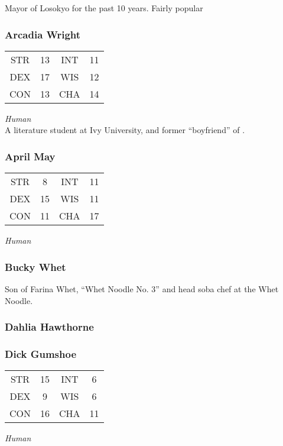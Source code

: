 Mayor of Losokyo for the past 10 years. Fairly popular


\subsubsection{Arcadia Wright}
\label{people:phoenix}
\begin{center}
\begin{tabular}{c c|c c}
STR & 13 & INT & 11\\
DEX & 17 & WIS & 12 \\
CON & 13 & CHA & 14 \end{tabular}\end{center}
\textit{Human}\\
A literature student at Ivy University, and former ``boyfriend'' of . 



\subsubsection{April May}
\label{people:aprilmay}
\begin{center}
\begin{tabular}{c c|c c}
STR & 8 & INT & 11\\
DEX & 15 & WIS & 11 \\
CON & 11 & CHA & 17 \end{tabular}\end{center}
\textit{Human}\\

\subsubsection{Bucky Whet}
\label{people:bucky}
Son of Farina Whet, ``Whet Noodle No. 3'' and head soba chef at the Whet Noodle. 


\subsubsection{Dahlia Hawthorne}
\label{people:dahlia}

\subsubsection{Dick Gumshoe}
\label{people:gumshoe}
\begin{center}
\begin{tabular}{c c|c c}
STR & 15 & INT & 6\\
DEX & 9 & WIS & 6 \\
CON & 16 & CHA & 11 \end{tabular}\end{center}
\textit{Human}\\

